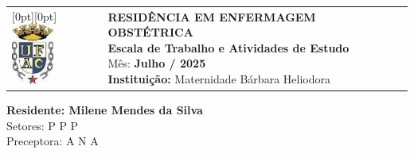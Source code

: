 \begin{flushleft}
    \begin{tabular}{@{}l l@{}}
        \raisebox{0pt}[0pt][0pt]{\includegraphics[height=2cm]{escala/recursos/ufac-logo.jpeg}} &
        \parbox[b][2cm][t]{0.82\linewidth}{
            \raggedright
            {\fontsize{11pt}{13pt}\selectfont
                \textbf{RESIDÊNCIA EM ENFERMAGEM OBSTÉTRICA} \\
                \textbf{Escala de Trabalho e Atividades de Estudo} \\
                Mês:\textbf{ Julho / 2025 }\\
                \textbf{Instituição:} Maternidade Bárbara Heliodora
            }
        }
    \end{tabular}

    {\fontsize{12pt}{14pt}\selectfont
        \textbf{Residente: Milene Mendes da Silva} \\
        Setores: P P P\\
        Preceptora: A N A
    }
\end{flushleft}
